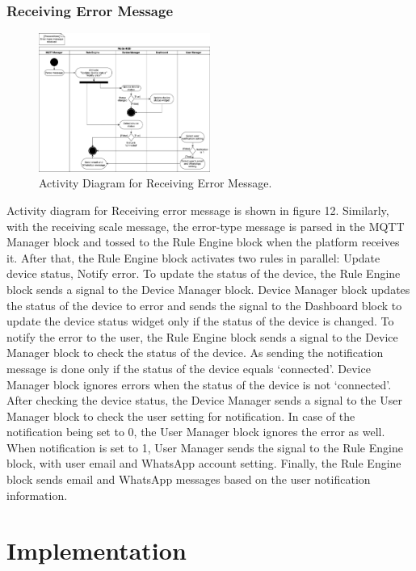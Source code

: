 \documentclass[conference]{IEEEtran}
\begin{document}
\subsubsection{Receiving Error Message}
\begin{figure}[htbp]
\centerline{\includegraphics[width=0.5\textwidth]{./images/errorMessageReceived.png}}
\caption{Activity Diagram for Receiving Error Message.}
\label{fig}
\end{figure}

Activity diagram for Receiving error message is shown in figure 12. Similarly, with the receiving scale message, the error-type message is parsed in the MQTT Manager block and tossed to the Rule Engine block when the platform receives it. After that, the Rule Engine block activates two rules in parallel: Update device status, Notify error. To update the status of the device, the Rule Engine block sends a signal to the Device Manager block. Device Manager block updates the status of the device to error and sends the signal to the Dashboard block to update the device status widget only if the status of the device is changed. To notify the error to the user, the Rule Engine block sends a signal to the Device Manager block to check the status of the device. As sending the notification message is done only if the status of the device equals ‘connected’. Device Manager block ignores errors when the status of the device is not ‘connected’. After checking the device status, the Device Manager sends a signal to the User Manager block to check the user setting for notification. In case of the notification being set to 0, the User Manager block ignores the error as well. When notification is set to 1, User Manager sends the signal to the Rule Engine block, with user email and WhatsApp account setting. Finally, the Rule Engine block sends email and WhatsApp messages based on the user notification information.

\section{Implementation}
\end{document}
